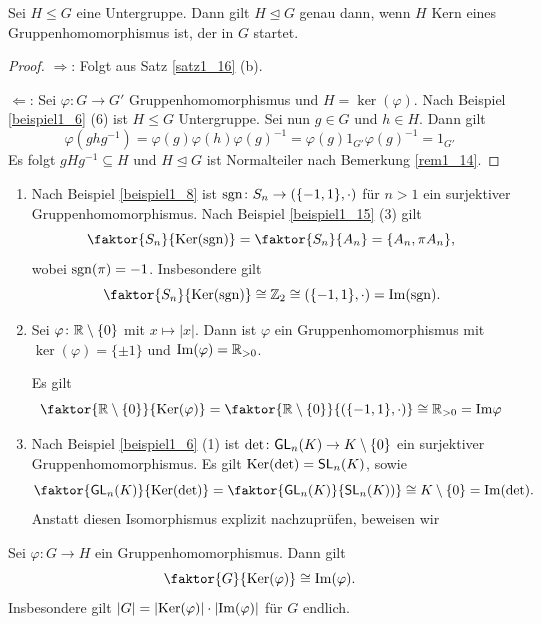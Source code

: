 \begin{prop}\label{prop1_18}
	Sei $H \leq G$ eine Untergruppe. Dann gilt $H \unlhd G$ genau dann, wenn $H$ Kern eines Gruppenhomomorphismus ist, der in $G$ startet.
\end{prop}
\begin{proof}
	\glqq{}$\Rightarrow$\grqq: Folgt aus Satz \ref{satz1_16} (b).
	
	\glqq{}$\Leftarrow$\grqq: Sei $\varphi \colon G \to G'$ Gruppenhomomorphismus und $H = \ker(\varphi)$. Nach Beispiel \ref{beispiel1_6} (6) ist $H \leq G$ Untergruppe. Sei nun $g \in G$ und $h \in H$. Dann gilt
	\[\varphi(ghg^{-1}) = \varphi(g) \varphi(h) \varphi(g)^{-1} = \varphi(g) 1_{G'} \varphi(g)^{-1} = 1_{G'}\]
	Es folgt $gHg^{-1} \subseteq H$ und $H \unlhd G$ ist Normalteiler nach Bemerkung \ref{rem1_14}.
\end{proof}
\begin{beispiel}\label{beispiel1_19}
	\begin{enumerate}[label=(\arabic*)]
		\item Nach Beispiel \ref{beispiel1_8} ist $\mathrm{sgn} \colon S_n \to (\{-1,1\}, \cdot)$ für $n > 1$ ein surjektiver Gruppenhomomorphismus. Nach Beispiel \ref{beispiel1_15} (3) gilt
		\[\faktor{S_n}{\ker(\sgn)} = \faktor{S_n}{A_n} = \{A_n, \pi A_n\},\]
		wobei $\mathrm{sgn}(\pi) = -1$. Insbesondere gilt 
		\[\faktor{S_n}{\ker(\sgn)} \cong \Z_2 \cong (\{-1, 1\}, \cdot) = \im(\sgn).\]
		\item Sei $\varphi \colon \mathbb{R}\setminus\{0\}$ mit $x\mapsto |x|$. Dann ist $\varphi$ ein Gruppenhomomorphismus mit $\ker(\varphi) =\{\pm1\}$ und $\mathrm{Im}(\varphi) = \mathbb{R}_{>0}$.
		
		Es gilt
		\[\faktor{\R \setminus \{0\}}{\ker(\varphi)} = \faktor{\R \setminus \{0\}}{(\{-1, 1\}, \cdot)} \cong \R_{>0} = \im{\varphi}\]
		
		\item Nach Beispiel \ref{beispiel1_6} (1) ist $\det \colon \mathsf{GL}_n(K) \to K\setminus\{0\}$ ein surjektiver Gruppenhomomorphismus. Es gilt $\mathrm{Ker}(\det) = \mathsf{SL}_n(K)$, sowie
		\[\faktor{\GL_n(K)}{\ker(\det)} = \faktor{\GL_n(K)}{\SL_n(K))} \cong K\setminus\{0\} = \im(\det).\]
		Anstatt diesen Isomorphismus explizit nachzuprüfen, beweisen wir
	\end{enumerate}
\end{beispiel}
\begin{satz}[Homomorphiesatz]\label{satz1_20}
	Sei $\varphi \colon G \to H$ ein Gruppenhomomorphismus. Dann gilt
	\[\faktor{G}{\ker(\varphi)} \cong \im(\varphi).\]
	Insbesondere gilt $|G| = |\mathrm{Ker}(\varphi)| \cdot |\mathrm{Im}(\varphi)|$ für $G$ endlich.
\end{satz}
